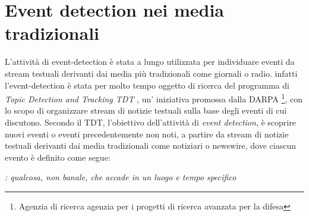 


\section{Event detection nei media tradizionali}
L'attività di event-detection è stata a lungo utilizzata per individuare eventi da stream testuali derivanti dai media più tradizionali come giornali o radio. infatti l'event-detection è stata per molto tempo oggetto di ricerca del programma di \emph{Topic Detection and Tracking TDT} \cite{Allan:2002:TDT:772260}, un' iniziativa	promossa dalla DARPA \footnote{Agenzia di ricerca agenzia per i progetti di ricerca avanzata per la difesa}, con lo scopo di organizzare stream di notizie testuali sulla base degli eventi di cui discutono. Secondo il TDT, l'obiettivo dell'attività di \emph{event detection}, è scoprire nuovi  eventi o eventi precedentemente non noti, a partire da stream di notizie testuali derivanti dai media tradizionali come notiziari o newswire, dove ciascun evento è definito come segue:


\begin{definizione}[Evento]
\label{def:evento}
\emph{: qualcosa, non banale, che accade in un luogo e tempo specifico}
\end{definizione}


